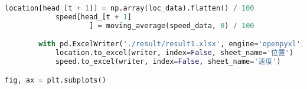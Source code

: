\begin{lstlisting}[language=python]
            location[head_[t + 1]] = np.array(loc_data).flatten() / 100
            speed[head_[t + 1]
                    ] = moving_average(speed_data, 8) / 100

        with pd.ExcelWriter('./result/result1.xlsx', engine='openpyxl') as writer:
            location.to_excel(writer, index=False, sheet_name='位置')
            speed.to_excel(writer, index=False, sheet_name='速度')

fig, ax = plt.subplots()
\end{lstlisting}